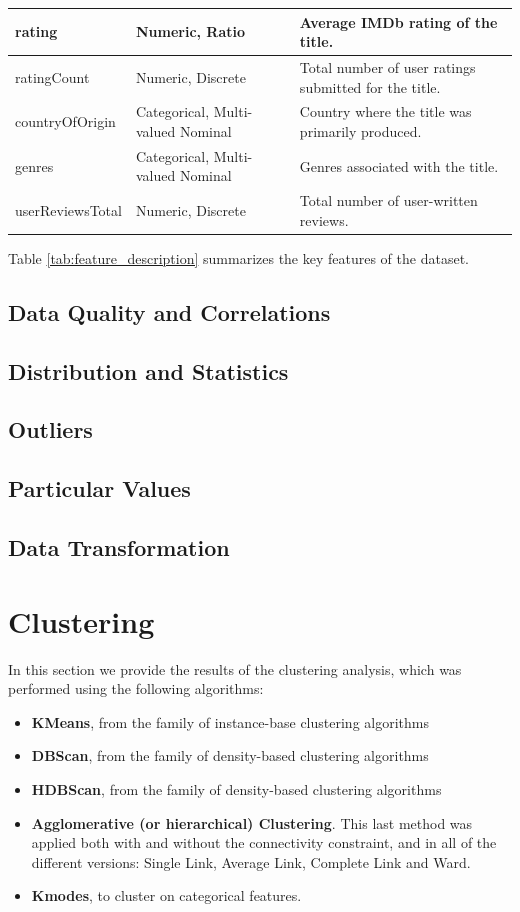 \documentclass[10pt]{article}
\begin{document}
\begin{center}
\begin{longtable}{| >{\ttfamily}p{5cm} | p{4cm} | p{7cm} |}
\hline
rating & Numeric, Ratio & Average IMDb rating of the title. \\
\hline
ratingCount & Numeric, Discrete & Total number of user ratings submitted for the title. \\
\hline
countryOfOrigin & Categorical, Multi-valued Nominal & Country where the title was primarily produced. \\
\hline
genres & Categorical, Multi-valued Nominal & Genres associated with the title. \\
\hline
userReviewsTotal & Numeric, Discrete & Total number of user-written reviews. \\
\hline
\end{longtable}
\end{center}
 Table \ref{tab:feature_description} summarizes the key features of the dataset.
\subsection{Data Quality and Correlations}
\subsection{Distribution and Statistics}
\subsection{Outliers}
\subsection{Particular Values}
\subsection{Data Transformation}

\section{Clustering}
In this section we provide the results of the clustering analysis, which was performed using the following algorithms:

\begin{itemize}
    \item\textbf{KMeans}, from the family of instance-base clustering algorithms
    \item\textbf{DBScan}, from the family of density-based clustering algorithms
    \item\textbf{HDBScan}, from the family of density-based clustering algorithms
    \item\textbf{Agglomerative (or hierarchical) Clustering}. This last method was applied both with and without the connectivity constraint, and in all of the different versions: Single Link, Average Link, Complete Link and Ward.
    \item\textbf{Kmodes}, to cluster on categorical features.
\end{itemize}
\end{document}
